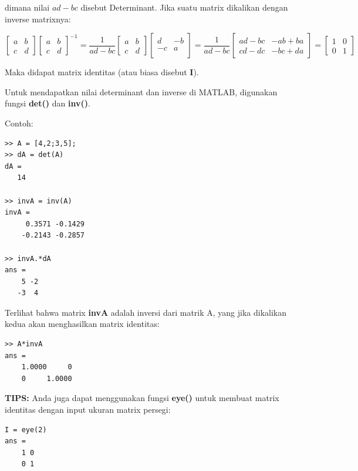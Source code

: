 \documentclass[12pt]{book}
\begin{document}
	dimana nilai $ad-bc$ disebut Determinant.
	Jika suatu matrix dikalikan dengan inverse matrixnya:
	
	\[
	\begin{bmatrix}
		a & b\\
		c & d
	\end{bmatrix}
	\begin{bmatrix}
		a & b\\
		c & d
	\end{bmatrix}^{-1}
	=
	\frac{1}{ad-bc}
	\begin{bmatrix}
		a & b\\
		c & d
	\end{bmatrix}
	\begin{bmatrix}
		d & -b \\
		-c & a\\
	\end{bmatrix}
	=
	\frac{1}{ad-bc}
	\begin{bmatrix}
		ad-bc & -ab+ba\\
		cd-dc & -bc+da
	\end{bmatrix}
	=
	\begin{bmatrix}
		1 & 0\\
		0 & 1
	\end{bmatrix}
	\]
	
	Maka didapat matrix identitas (atau biasa disebut \textbf{I}).
	
	Untuk mendapatkan nilai determinant dan inverse di MATLAB, digunakan fungsi \textbf{det()} dan \textbf{inv()}.
	
	Contoh:
	\begin{verbatim}
>> A = [4,2;3,5];
>> dA = det(A)
dA = 
   14
   
>> invA = inv(A)
invA =
     0.3571 -0.1429
    -0.2143 -0.2857
    
>> invA.*dA
ans =
    5 -2
   -3  4
	\end{verbatim}

	Terlihat bahwa matrix \textbf{invA} adalah inversi dari matrik A, yang jika dikalikan kedua akan menghasilkan matrix identitas:
	\begin{verbatim}
>> A*invA
ans =
    1.0000     0
    0     1.0000
	\end{verbatim}

	\textbf{TIPS:} Anda juga dapat menggunakan fungsi \textbf{eye()} untuk membuat matrix identitas dengan input ukuran matrix persegi:
	 \begin{verbatim}
I = eye(2)
ans = 
    1 0
    0 1
	 \end{verbatim}
	
\end{document}
